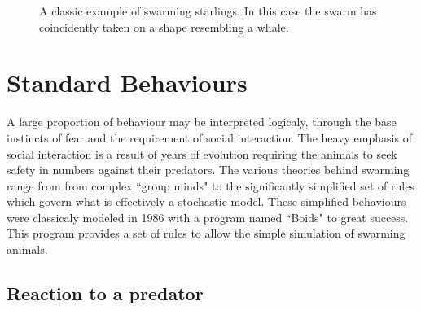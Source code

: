 \documentclass[
reprint,
showpacs,preprintnumbers,
amsmath,amssymb,
prl,
]{revtex4-1}
\begin{document}
\begin{figure}[!htp]

	\caption{
		A classic example of swarming starlings.\cite{jameswainscoatphoto}
		In this case the swarm has coincidently taken on a shape resembling a whale.
	}

	\label{fig:birdswarm}
\end{figure}

\section{\label{sec:level1}Standard Behaviours}
A large proportion of behaviour may be interpreted logicaly, through the base instincts of fear and the requirement of social interaction.
The heavy emphasis of social interaction is a result of years of evolution requiring the animals to seek safety in numbers against their predators.
The various theories behind swarming range from from complex ``group minds"\cite{diffusionadaption} to the significantly simplified set of rules which govern what is effectively a stochastic model.\cite{modellingflocks}
These simplified behaviours were classicaly modeled in 1986 with a program named ``Boids"\cite{boids} to great success.
This program provides a set of rules to allow the simple simulation of swarming animals.

\subsection{\label{sec:level2}Reaction to a predator}
\end{document}
